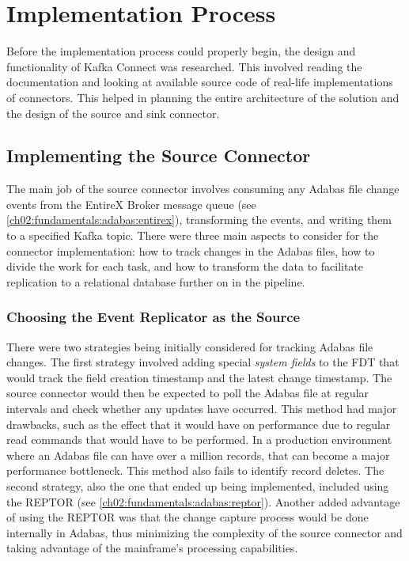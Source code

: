 \section{Implementation Process}
Before the implementation process could properly begin, the design and functionality of Kafka Connect was researched. This involved reading the documentation and looking at available source code of real-life implementations of connectors. This helped in planning the entire architecture of the solution and the design of the source and sink connector.

\subsection{Implementing the Source Connector}
The main job of the source connector involves consuming any Adabas file change events from the EntireX Broker message queue (see \ref{ch02:fundamentals:adabas:entirex}), transforming the events, and writing them to a specified Kafka topic. There were three main aspects to consider for the connector implementation: how to track changes in the Adabas files, how to divide the work for each task, and how to transform the data to facilitate replication to a relational database further on in the pipeline.

\subsubsection{Choosing the Event Replicator as the Source}
There were two strategies being initially considered for tracking Adabas file changes. The first strategy involved adding special \textit{system fields} to the \ac{FDT} that would track the field creation timestamp and the latest change timestamp. The source connector would then be expected to poll the Adabas file at regular intervals and check whether any updates have occurred. This method had major drawbacks, such as the effect that it would have on performance due to regular read commands that would have to be performed. In a production environment where an Adabas file can have over a million records, that can become a major performance bottleneck. This method also fails to identify record deletes. The second strategy, also the one that ended up being implemented, included using the \ac{REPTOR} (see \ref{ch02:fundamentals:adabas:reptor}). Another added advantage of using the \ac{REPTOR} was that the change capture process would be done internally in Adabas, thus minimizing the complexity of the source connector and taking advantage of the mainframe's processing capabilities.

